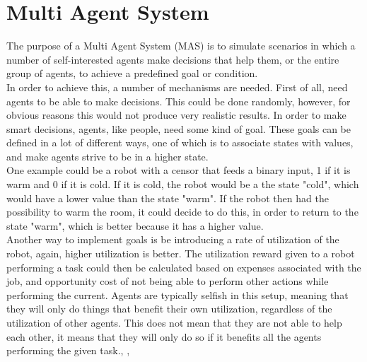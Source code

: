 \chapter{Multi Agent System}
The purpose of a Multi Agent System (MAS) is to simulate scenarios in which a number of self-interested agents make decisions that help them, or the entire group of agents, to achieve a predefined goal or condition.\\

\indent In order to achieve this, a number of mechanisms are needed. First of all, need agents to be able to make decisions. This could be done randomly, however, for obvious reasons this would not produce very realistic results. In order to make smart decisions, agents, like people, need some kind of goal. These goals can be defined in a lot of different ways, one of which is to associate states with values, and make agents strive to be in a higher state.\cite{MAS} \\ 

\indent One example could be a robot with a censor that feeds a binary input, 1 if it is warm and 0 if it is cold. If it is cold, the robot would be a the state "cold", which would have a lower value than the state "warm". If the robot then had the possibility to warm the room, it could decide to do this, in order to return to the state "warm", which is better because it has a higher value.\\

\indent Another way to implement goals is be introducing a rate of utilization of the robot, again, higher utilization is better. The utilization reward given to a robot performing a task could then be calculated based on expenses associated with the job, and opportunity cost of not being able to perform other actions while performing the current. Agents are typically selfish in this setup, meaning that they will only do things that benefit their own utilization, regardless of the utilization of other agents. This does not mean that they are not able to help each other, it means that they will only do so if it benefits all the agents performing the given task.\cite{MAS}, \cite{MAP}, \cite{fundamentalsofMAS}


